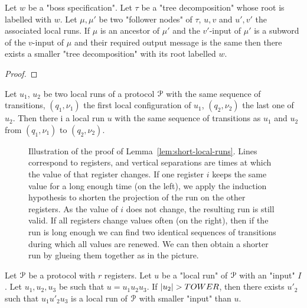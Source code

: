 \begin{lemma}
	Let $w$ be a "boss specification".
	Let $\tau$ be a "tree decomposition" whose root is labelled with $w$.
	Let $\mu, \mu'$ be two "follower nodes" of $\tau$, $u, v$ and $u', v'$ the associated local runs.
	If $\mu$ is an ancestor of $\mu'$ and the $v'$-input of $\mu'$ is a subword of the $v$-input of $\mu$ and their required output message is the same then there exists a smaller "tree decomposition" with its root labelled $w$.  
\end{lemma}

\begin{proof}
\end{proof}

\begin{lemma}
	Let $u_1$, $u_2$ be two local runs of a protocol $\mathcal{P}$ with the same sequence of transitions, $(q_1, \nu_1)$ the first local configuration of $u_1$, $(q_2, \nu_2)$ the last one of $u_2$. Then there i a local run $u$ with the same sequence of transitions as $u_1$ and $u_2$ from $(q_1, \nu_1)$ to $(q_2, \nu_2)$. 
\end{lemma}

\begin{figure}
	
	\caption{Illustration of the proof of Lemma~\ref{lem:short-local-runs}. Lines correspond to registers, and vertical separations are times at which the value of that register changes. If one register $i$ keeps the same value for a long enough time (on the left), we apply the induction hypothesis to shorten the projection of the run on the other registers. As the value of $i$ does not change, the resulting run is still valid. If all registers change values often (on the right), then if the run is long enough we can find two identical sequences of transitions during which all values are renewed. We can then obtain a shorter run by glueing them together as in the picture.}
\end{figure}




\begin{lemma}
	\label{lem:short-local-runs}
	Let $\mathcal{P}$ be a protocol with $r$ registers.
	Let $u$ be a "local run" of $\mathcal{P}$ with an "input" $I$.
	Let $u_1, u_2, u_3$ be such that $u=u_1u_2u_3$.
	If $|u_2| > TOWER$, then there exists $u'_2$ such that $u_1u'_2u_3$ is a local run of $\mathcal{P}$ with smaller "input" than $u$. 
\end{lemma}

